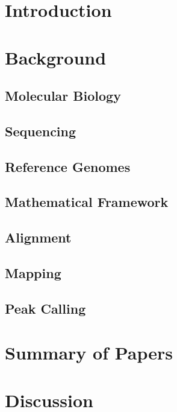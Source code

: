\chapter{Introduction}

\chapter{Background}
\label{sec:background}
\section{Molecular Biology}
\label{sec:biology}

\section{Sequencing}
\label{sec:sequencing}

\section{Reference Genomes}
\label{sec:refgenomes}

\section{Mathematical Framework}
\label{sec:notation}

\section{Alignment}
\label{sec:alignment}

\section{Mapping}
\label{sec:mapping}

\section{Peak Calling}
\label{sec:peakcalling}

\chapter{Summary of Papers}
\label{sec:summary}

\chapter{Discussion}
\label{sec:discussion}

% 
% 
% 
% 
% 
% 
% 

